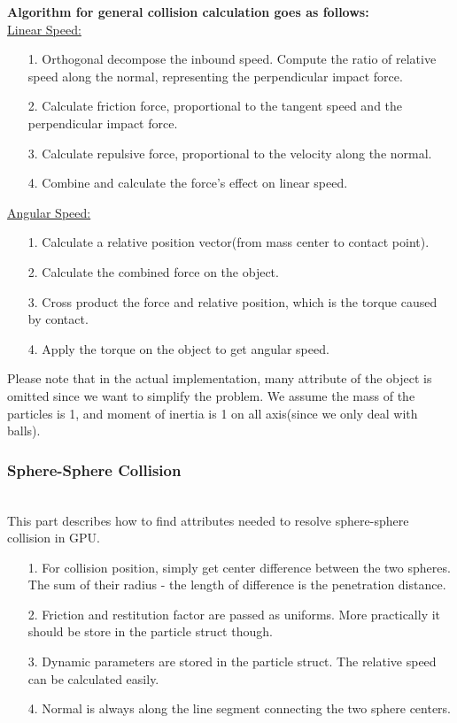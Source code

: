 \documentclass[acmtog]{acmart}
\begin{document}
\textbf{Algorithm for general collision calculation goes as follows:}\\
\subitem \underline{Linear Speed:}
\begin{enumerate}
	\item [1.] Orthogonal decompose the inbound speed. Compute the ratio of relative speed along the normal, representing the perpendicular impact force.
	\item [2.] Calculate friction force, proportional to the tangent speed and the perpendicular impact force.
	\item [3.] Calculate repulsive force, proportional to the velocity along the normal.
	\item [4.] Combine and calculate the force's effect on linear speed.
\end{enumerate}
\subitem \underline{Angular Speed:}
\begin{enumerate}
	\item [1.] Calculate a relative position vector(from mass center to contact point).
	\item [2.] Calculate the combined force on the object.
	\item [3.] Cross product the force and relative position, which is the torque caused by contact.
	\item [4.] Apply the torque on the object to get angular speed.
\end{enumerate}
Please note that in the actual implementation, many attribute of the object is omitted since we want to simplify the problem. We assume the mass of the particles is 1, and moment of inertia is 1 on all axis(since we only deal with balls).
\subsubsection{Sphere-Sphere Collision}
\quad \\
This part describes how to find attributes needed to resolve sphere-sphere collision in GPU.
\begin{enumerate}
	\item [1.] For collision position, simply get center difference between the two spheres. The sum of their radius - the length of difference is the penetration distance.
	\item [2.] Friction and restitution factor are passed as uniforms. More practically it should be store in the particle struct though.
	\item [3.] Dynamic parameters are stored in the particle struct. The relative speed can be calculated easily.
	\item [4.] Normal is always along the line segment connecting the two sphere centers. 
\end{enumerate}
\end{document}
